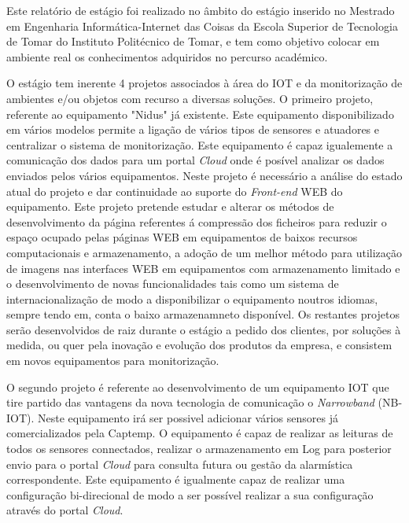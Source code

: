 
\vspace{1cm}
\noindent
\par Este relatório de estágio foi realizado no âmbito do estágio inserido no Mestrado em Engenharia Informática-Internet das Coisas da Escola Superior de Tecnologia de Tomar do Instituto Politécnico de Tomar, e tem como objetivo colocar em ambiente real os conhecimentos adquiridos no percurso académico.

\par O estágio tem inerente 4 projetos associados à área do IOT e da monitorização de ambientes e/ou objetos com recurso a diversas soluções. O primeiro projeto, referente ao equipamento "Nidus" já existente. Este equipamento disponibilizado em vários modelos permite a ligação de vários tipos de sensores e atuadores  e centralizar o sistema de monitorização. Este equipamento é capaz igualemente a comunicação dos dados para um portal \textit{Cloud} onde é posível analizar os dados enviados pelos vários equipamentos. Neste projeto é necessário a análise do estado atual do projeto e dar continuidade ao suporte do \textit{Front-end} WEB do equipamento. Este projeto pretende estudar e alterar os métodos de desenvolvimento da página referentes á compressão dos ficheiros para reduzir o espaço ocupado pelas páginas WEB em equipamentos de baixos recursos computacionais e armazenamento, a adoção de um melhor método para utilização de imagens nas interfaces WEB em equipamentos com armazenamento limitado e o desenvolvimento de novas funcionalidades tais como um sistema de internacionalização de modo a disponibilizar o equipamento noutros idiomas, sempre tendo em, conta o baixo armazenamneto disponível. Os restantes projetos serão desenvolvidos de raiz durante o estágio  a pedido dos clientes, por soluções à medida, ou quer pela inovação e evolução dos produtos da empresa, e consistem em novos equipamentos para monitorização.

\par O segundo projeto é referente ao desenvolvimento de um equipamento IOT que tire partido das vantagens da nova tecnologia de comunicação o \textit{Narrowband} (NB-IOT). Neste equipamento irá ser possivel adicionar vários sensores já comercializados pela Captemp. O equipamento é capaz de realizar as leituras de todos os sensores connectados, realizar o armazenamento em Log para posterior envio para o portal \textit{Cloud} para consulta futura ou gestão da alarmística correspondente. Este equipamento é igualmente capaz de realizar uma configuração bi-direcional de modo a ser possível realizar a sua configuração através do portal \textit{Cloud}.

